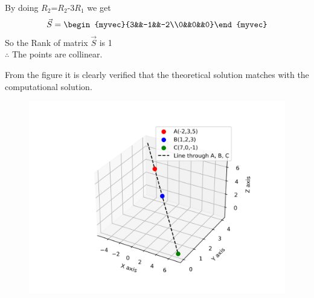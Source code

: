 \documentclass[journal]{IEEEtran}
\begin{document}
By doing $R_2$=$R_2$-3$R_1$ we get \\
\begin{align}
   \vec{S}=\begin{myvec}{3&&-1&&-2\\0&&0&&0}\end{myvec}
\end{align}
So the Rank of matrix $\vec{S}$ is 1\\
$\therefore$ The points are collinear.

\newpage
\vspace*{0.25cm}

From the figure it is clearly verified that the theoretical solution matches with the computational solution.\\
\begin{figure}[h!]
    \centering
    \includegraphics[height=0.5\textheight, keepaspectratio]{figs/fig.png}
    \label{figure_1}
\end{figure}
 
\end{document}
